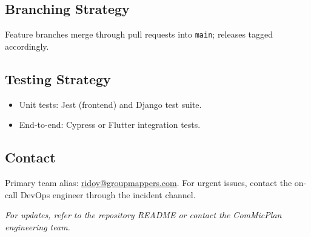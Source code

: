 \documentclass[11pt]{article}
\begin{document}
\subsection{Branching Strategy}
Feature branches merge through pull requests into \texttt{main}; releases tagged accordingly.

\subsection{Testing Strategy}
\begin{itemize}[leftmargin=*]
  \item Unit tests: Jest (frontend) and Django test suite.
  \item End-to-end: Cypress or Flutter integration tests.
\end{itemize}

\subsection{Contact}
Primary team alias: \href{mailto:ridoy@groupmappers.com}{ridoy@groupmappers.com}. For urgent issues, contact the on-call DevOps engineer through the incident channel.

\vfill
\noindent\textit{For updates, refer to the repository README or contact the ComMicPlan engineering team.}
\end{document}
